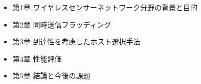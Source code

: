 \begin{itemize}
\item{第1章 ワイヤレスセンサーネットワーク分野の背景と目的}
\item{第2章 同時送信フラッディング}
\item{第3章 到達性を考慮したホスト選択手法}
\item{第4章 性能評価}
\item{第5章 結論と今後の課題}
\end{itemize}
